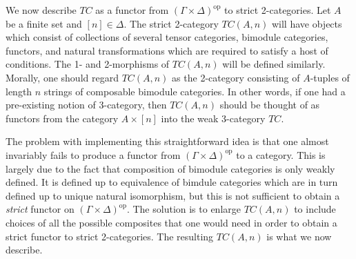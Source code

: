 \documentclass{amsart}
\begin{document}
We now describe $TC$ as a functor from $(\Gamma \times \Delta)^\textrm{op}$ to strict 2-categories. Let $A$ be a finite set and $[n]\in \Delta$. The strict 2-category $TC(A,n)$ will have objects which consist of collections of several tensor categories, bimodule categories, functors, and natural transformations which are required to satisfy a host of conditions. The 1- and 2-morphisms of $TC(A,n)$ will be defined similarly. Morally, one should regard $TC(A,n)$ as the 2-category consisting of $A$-tuples of length $n$ strings of composable bimodule categories. In other words, if one had a pre-existing notion of 3-category, then $TC(A,n)$ should be thought of as functors from the category $A \times [n]$ into the weak 3-category $TC$. 

The problem with implementing this straightforward idea is that one almost invariably fails to produce a functor from $(\Gamma \times \Delta)^\textrm{op}$ to a category. This is largely due to the fact that  composition of bimodule categories is only weakly defined. It is defined up to equivalence of bimdule categories which are in turn defined up to unique natural isomorphism, but this is not sufficient to obtain a {\em strict} functor on $(\Gamma \times \Delta)^\textrm{op}$. The solution is to enlarge $TC(A,n)$ to include choices of all the possible composites that one would need in order to obtain a strict functor to strict 2-categories. The resulting $TC(A,n)$ is what we now describe.
\end{document}
